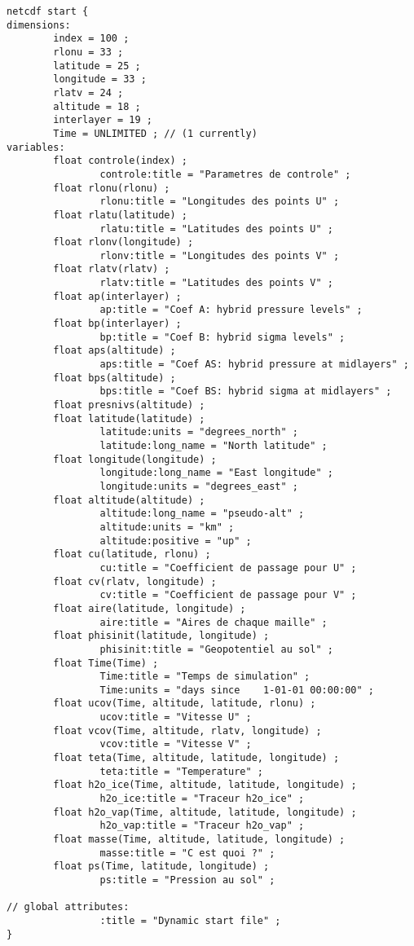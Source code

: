 {\footnotesize
\begin{verbatim}
netcdf start {
dimensions:
        index = 100 ;
        rlonu = 33 ;
        latitude = 25 ;
        longitude = 33 ;
        rlatv = 24 ;
        altitude = 18 ;
        interlayer = 19 ;
        Time = UNLIMITED ; // (1 currently)
variables:
        float controle(index) ;
                controle:title = "Parametres de controle" ;
        float rlonu(rlonu) ;
                rlonu:title = "Longitudes des points U" ;
        float rlatu(latitude) ;
                rlatu:title = "Latitudes des points U" ;
        float rlonv(longitude) ;
                rlonv:title = "Longitudes des points V" ;
        float rlatv(rlatv) ;
                rlatv:title = "Latitudes des points V" ;
        float ap(interlayer) ;
                ap:title = "Coef A: hybrid pressure levels" ;
        float bp(interlayer) ;
                bp:title = "Coef B: hybrid sigma levels" ;
        float aps(altitude) ;
                aps:title = "Coef AS: hybrid pressure at midlayers" ;
        float bps(altitude) ;
                bps:title = "Coef BS: hybrid sigma at midlayers" ;
        float presnivs(altitude) ;
        float latitude(latitude) ;
                latitude:units = "degrees_north" ;
                latitude:long_name = "North latitude" ;
        float longitude(longitude) ;
                longitude:long_name = "East longitude" ;
                longitude:units = "degrees_east" ;
        float altitude(altitude) ;
                altitude:long_name = "pseudo-alt" ;
                altitude:units = "km" ;
                altitude:positive = "up" ;
        float cu(latitude, rlonu) ;
                cu:title = "Coefficient de passage pour U" ;
        float cv(rlatv, longitude) ;
                cv:title = "Coefficient de passage pour V" ;
        float aire(latitude, longitude) ;
                aire:title = "Aires de chaque maille" ;
        float phisinit(latitude, longitude) ;
                phisinit:title = "Geopotentiel au sol" ;
        float Time(Time) ;
                Time:title = "Temps de simulation" ;
                Time:units = "days since    1-01-01 00:00:00" ;
        float ucov(Time, altitude, latitude, rlonu) ;
                ucov:title = "Vitesse U" ;
        float vcov(Time, altitude, rlatv, longitude) ;
                vcov:title = "Vitesse V" ;
        float teta(Time, altitude, latitude, longitude) ;
                teta:title = "Temperature" ;
        float h2o_ice(Time, altitude, latitude, longitude) ;
                h2o_ice:title = "Traceur h2o_ice" ;
        float h2o_vap(Time, altitude, latitude, longitude) ;
                h2o_vap:title = "Traceur h2o_vap" ;
        float masse(Time, altitude, latitude, longitude) ;
                masse:title = "C est quoi ?" ;
        float ps(Time, latitude, longitude) ;
                ps:title = "Pression au sol" ;

// global attributes:
                :title = "Dynamic start file" ;
}
\end{verbatim}
}

